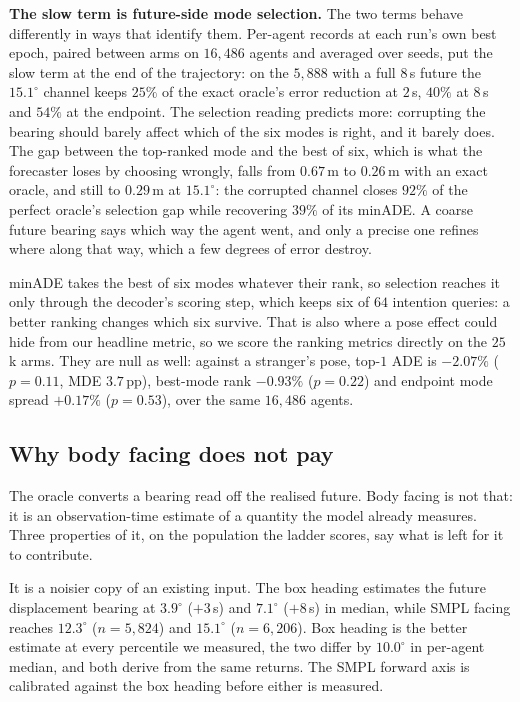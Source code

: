 \documentclass[conference]{IEEEtran}
\newcommand{\minADE}{minADE\xspace}
\begin{document}
\textbf{The slow term is future-side mode selection.} The two terms behave
differently in ways that identify them.
Per-agent records at each run's own best epoch, paired between arms on
$16{,}486$ agents and averaged over seeds, put the slow term at the end of
the trajectory: on the $5{,}888$ with a full $8$\,s future the $15.1^\circ$ channel keeps $25\%$ of the exact oracle's error
reduction at $2$\,s, $40\%$ at $8$\,s and $54\%$ at the endpoint. The selection reading predicts more: corrupting the bearing should barely affect which of the
six modes is right, and it barely does. The gap between the top-ranked mode and the best
of six, which is what the forecaster loses by choosing wrongly, falls from $0.67$\,m to
$0.26$\,m with an exact oracle, and still to $0.29$\,m at $15.1^\circ$: the
corrupted channel closes $92\%$ of the perfect oracle's selection gap while
recovering $39\%$ of its \minADE. A coarse future bearing says which way the
agent went, and only a precise one refines where along that way, which a few
degrees of error destroy.

\minADE takes the best of six modes whatever their rank, so selection reaches it
only through the decoder's scoring step, which keeps six of $64$ intention
queries: a better ranking changes which six survive.
That is also where a pose effect could hide from our headline metric, so we
score the ranking metrics directly on the $25$k arms. They are null as well:
against a stranger's pose, top-$1$ ADE is $-2.07\%$ ($p{=}0.11$, MDE
$3.7$\,pp), best-mode rank $-0.93\%$ ($p{=}0.22$) and endpoint mode spread
$+0.17\%$ ($p{=}0.53$), over the same $16{,}486$ agents.

\subsection{Why body facing does not pay}
\label{sec:belowfloor}
The oracle converts a bearing read off the realised future. Body facing is not
that: it is an observation-time estimate of a quantity the model already
measures. Three properties of it, on the population the ladder scores, say what
is left for it to contribute.

It is a noisier copy of an existing input. The box heading estimates the
future displacement bearing at $3.9^\circ$ ($+3$\,s) and $7.1^\circ$ ($+8$\,s)
in median, while SMPL facing reaches $12.3^\circ$ ($n{=}5{,}824$) and $15.1^\circ$
($n{=}6{,}206$). Box heading is the better estimate at every percentile we
measured, the two differ by $10.0^\circ$ in per-agent median, and both derive
from the same returns. The SMPL forward axis is calibrated against the
box heading before either is measured.
\end{document}
